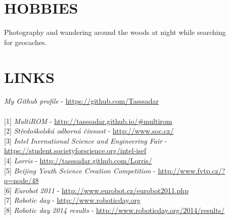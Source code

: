 \documentclass[margin]{res}
\begin{document}
\begin{resume}
\section{HOBBIES}
Photography and wandering around the woods at night while searching\\for geocaches.

\linespread{1.6}
\section{LINKS}
\textit{My Github profile} - \url{https://github.com/Tasssadar} \\
\\
\label{multirom}[1] \textit{MultiROM} - \url{http://tasssadar.github.io/#multirom} \\
\label{soc}[2] \textit{Středoškolská odborná činnost} - \url{http://www.soc.cz/} \\
\label{isef}[3] \textit{Intel Inernational Science and Engineering Fair} - \\\phantom{[3] }\url{https://student.societyforscience.org/intel-isef} \\
\label{lorris}[4] \textit{Lorris} - \url{http://tasssadar.github.com/Lorris/} \\
\label{byscc}[5] \textit{Beijing Youth Science Creation Competition} - \url{http://www.fvtp.cz/?q=node/48} \\
\label{eurobot}[6] \textit{Eurobot 2011} - \url{http://www.eurobot.cz/eurobot2011.php} \\
\label{day}[7] \textit{Robotic day} - \url{http://www.roboticday.org} \\
\label{day2}[8] \textit{Robotic day 2014 results} - \url{http://www.roboticday.org/2014/results/} \\


\end{resume}
\end{document}
